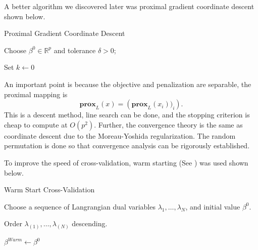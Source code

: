 \documentclass[12pt, a4paper, reqno]{article}
\numberwithin{equation}{section}
\newcommand{\R}{\mathbb{R}}
\begin{document}
A better algorithm we discovered later was proximal gradient coordinate descent shown below.

\vspace{.5cm}
\begin{algorithm}[H]
\caption{Proximal Gradient Coordinate Descent}
Choose $\beta^0 \in \R^p$ and tolerance $\delta > 0$;

Set $k \gets 0$

\end{algorithm}
\vspace{.5cm}

An important point is because the objective and penalization are separable, the proximal mapping is
\[
\textbf{prox}_{L}(x) = \left( \textbf{prox}_{L}(x_i))_i \right). 
\]
This is a descent method, line search can be done, and the stopping criterion is cheap to compute at $O(p^2)$.
Further, the convergence theory is the same as coordinate descent due to the Moreau-Yoshida regularization.
The random permutation is done so that convergence analysis can be rigorously established.

To improve the speed of cross-validation, warm starting (See \cite{glmnet}) was used shown below.

\vspace{.5cm}
\begin{algorithm}[H]
\caption{Warm Start Cross-Validation}
Choose a sequence of Langrangian dual variables $\lambda_1, \ldots, \lambda_N$, and initial value $\beta^0$.

Order $\lambda_{(1)}, \ldots, \lambda_{(N)}$ descending.

$\beta^{Warm} \gets \beta^0$ 


\end{algorithm}
\vspace{.5cm}
\end{document}
